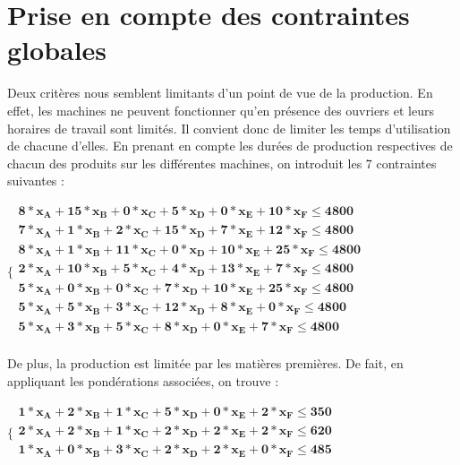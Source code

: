 \documentclass[12pt]{article}
\begin{document}
\section{Prise en compte des contraintes globales}
\label{globconst}
Deux critères nous semblent limitants d'un point de vue de la production. En effet, les machines ne peuvent fonctionner qu'en présence des ouvriers et leurs horaires de travail sont limités. Il convient donc de limiter les temps d'utilisation de chacune d'elles.
En prenant en compte les durées de production respectives de chacun des produits sur les différentes machines, on introduit les 7 contraintes suivantes :
\begin{center}
$\mathbf{ 
   \lbrace
   \begin{array}{c}
      8 * x_{A} + 15 * x_{B} + 0 * x_{C} + 5 * x_{D} + 0 * x_{E} + 10 * x_{F}\leq 4800 \\
      7 * x_{A} + 1 * x_{B} + 2 * x_{C} + 15 * x_{D} + 7 * x_{E} + 12 * x_{F} \leq 4800 \\
      8 * x_{A} + 1 * x_{B} + 11 * x_{C} + 0 * x_{D} + 10 * x_{E} + 25 * x_{F} \leq 4800 \\
      2 * x_{A} + 10 * x_{B} + 5 * x_{C} + 4 * x_{D} + 13 * x_{E} + 7 * x_{F} \leq 4800 \\
      5 * x_{A} + 0 * x_{B} + 0 * x_{C} + 7 * x_{D} + 10 * x_{E} + 25 * x_{F} \leq 4800 \\
      5 * x_{A} + 5 * x_{B} + 3 * x_{C} + 12 * x_{D} + 8 * x_{E} + 0 * x_{F} \leq 4800 \\
      5 * x_{A} + 3 * x_{B} + 5 * x_{C} + 8 * x_{D} + 0 * x_{E} + 7 * x_{F} \leq 4800 \\
   \end{array}
 } $ 
\end{center}

De plus, la production est limitée par les matières premières. De fait, en appliquant les pondérations associées, on trouve :
\begin{center}
$\mathbf{
   \lbrace
   \begin{array}{c}
      1 * x_{A} + 2 * x_{B} + 1 * x_{C} + 5 * x_{D} + 0 * x_{E} + 2 * x_{F}\leq 350 \\
      2 * x_{A} + 2 * x_{B} + 1 * x_{C} + 2 * x_{D} + 2 * x_{E} + 2 * x_{F} \leq 620 \\
      1 * x_{A} + 0 * x_{B} + 3 * x_{C} + 2 * x_{D} + 2 * x_{E} + 0 * x_{F} \leq 485 \\
   \end{array}
 } $ 
\end{center}
\end{document}
